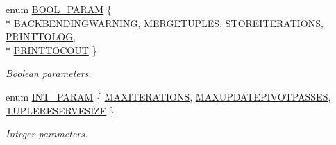 \begin{DoxyCompactItemize}
enum \hyperlink{classSGEnv_acff56acdb55b7734c7bc63c5ddf6af90}{B\-O\-O\-L\-\_\-\-P\-A\-R\-A\-M} \{ \\*
\hyperlink{classSGEnv_acff56acdb55b7734c7bc63c5ddf6af90aa0330f07e29bc2246c6bf564c7c14a43}{B\-A\-C\-K\-B\-E\-N\-D\-I\-N\-G\-W\-A\-R\-N\-I\-N\-G}, 
\hyperlink{classSGEnv_acff56acdb55b7734c7bc63c5ddf6af90aec53dc68487b0eb417bc3d97d00106dd}{M\-E\-R\-G\-E\-T\-U\-P\-L\-E\-S}, 
\hyperlink{classSGEnv_acff56acdb55b7734c7bc63c5ddf6af90aeeafd3b3d65296a2581dedb121168ed9}{S\-T\-O\-R\-E\-I\-T\-E\-R\-A\-T\-I\-O\-N\-S}, 
\hyperlink{classSGEnv_acff56acdb55b7734c7bc63c5ddf6af90a77e6100c348ce6f5449bd7f737d4e1a6}{P\-R\-I\-N\-T\-T\-O\-L\-O\-G}, 
\\*
\hyperlink{classSGEnv_acff56acdb55b7734c7bc63c5ddf6af90aa5dbef92e15cf4e4a0a2ff95adfe5992}{P\-R\-I\-N\-T\-T\-O\-C\-O\-U\-T}
 \}
\begin{DoxyCompactList}\small\item\em Boolean parameters. \end{DoxyCompactList}\item 
enum \hyperlink{classSGEnv_ad42a8834fadc101c871bd724ca028fad}{I\-N\-T\-\_\-\-P\-A\-R\-A\-M} \{ \hyperlink{classSGEnv_ad42a8834fadc101c871bd724ca028fada059016dbed1d9a14f4a375f48d96ce7a}{M\-A\-X\-I\-T\-E\-R\-A\-T\-I\-O\-N\-S}, 
\hyperlink{classSGEnv_ad42a8834fadc101c871bd724ca028fada1d094acb0d258a01e0dd0edd4139ef80}{M\-A\-X\-U\-P\-D\-A\-T\-E\-P\-I\-V\-O\-T\-P\-A\-S\-S\-E\-S}, 
\hyperlink{classSGEnv_ad42a8834fadc101c871bd724ca028fada7219a626081d79d6f92b9f23dcce0747}{T\-U\-P\-L\-E\-R\-E\-S\-E\-R\-V\-E\-S\-I\-Z\-E}
 \}
\begin{DoxyCompactList}\small\item\em Integer parameters. \end{DoxyCompactList}\end{DoxyCompactItemize}
